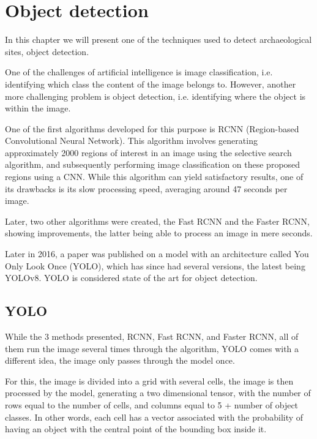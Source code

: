 

\chapter{Object detection}

\begin{introduction}
In this chapter we will present one of the techniques used to detect archaeological sites, object detection.
\end{introduction}

One of the challenges of artificial intelligence is image classification, i.e. identifying which class the content of the image belongs to. However, another more challenging problem is object detection, i.e. identifying where the object is within the image.

One of the first algorithms developed for this purpose is RCNN (Region-based Convolutional Neural Network). This algorithm involves generating approximately 2000 regions of interest in an image using the selective search algorithm, and subsequently performing image classification on these proposed regions using a CNN. While this algorithm can yield satisfactory results, one of its drawbacks is its slow processing speed, averaging around 47 seconds per image.

Later, two other algorithms were created, the Fast RCNN and the Faster RCNN, showing improvements, the latter being able to process an image in mere seconds.

Later in 2016, a paper was published on a model with an architecture called You Only Look Once (YOLO), which has since had several versions, the latest being YOLOv8.
YOLO is considered state of the art for object detection.




\section{YOLO}
While the 3 methods presented, RCNN, Fast RCNN, and Faster RCNN, all of them run the image several times through the algorithm, YOLO comes with a different idea, the image only passes through the model once.

For this, the image is divided into a grid\cite{yolodeepdive} with several cells, the image is then processed by the model, generating a two dimensional tensor, with the number of rows equal to the number of cells, and columns equal to 5 + number of object classes. In other words, each cell has a vector associated with the probability of having an object with the central point of the bounding box inside it.

